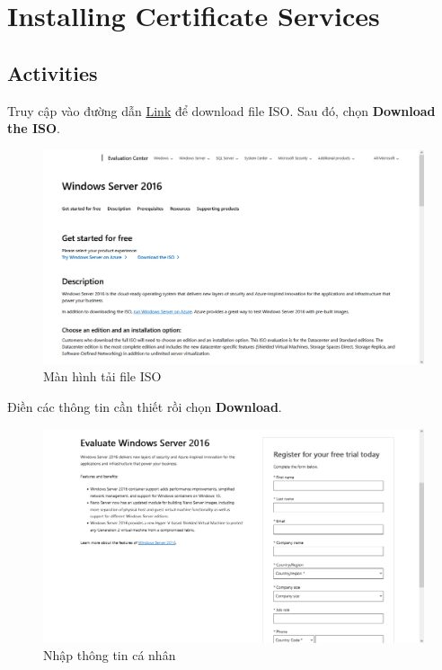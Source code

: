 \section{Installing Certificate Services}
\subsection{Activities}

 Truy cập vào đường dẫn \href{https://www.microsoft.com/en-us/evalcenter/evaluate-windows-server-2016}{Link} để download file ISO. Sau đó, chọn {\bf Download the ISO}.

\begin{figure}[!htb]
    \centering
    \includegraphics[width=1\linewidth]{figure//chapter4//lab4_1/download_iso.png}
    \caption{Màn hình tải file ISO}
    \label{fig:enter-label}
\end{figure}

 Điền các thông tin cần thiết rồi chọn {\bf Download}.

\begin{figure}[!htb]
    \centering
    \includegraphics[width=1\linewidth]{figure//chapter4//lab4_1/input_info.png}
    \caption{Nhập thông tin cá nhân}
    \label{fig:enter-label}
\end{figure}

